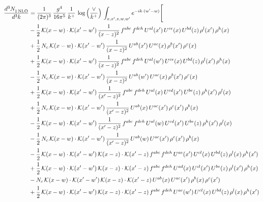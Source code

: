 \documentclass[9pt]{article}
\numberwithin{equation}{section}
\begin{document}
\begin{align}
\frac{d^{3}N_{1\,\rm NLO}^{\rm}}{d^{3}k}  & = \frac{1}{(2\pi)^{3}}\,\frac{g^{4}}{16\pi^{5}}\,\frac{1}{k^{+}}\,\log{\left(\frac{\vee}{k^{+}}\right)}\, \int_{x,x',z,w,w'}e^{-ik\cdot(w'-w)}\Bigg[\notag\\ & -\frac{1}{2}\,\mathcal{K}(x-w)\cdot\mathcal{K}(x'-w')\,\frac{1}{(x-z)^{2}}\,f^{abc}\,f^{deh}\,U^{al}(x')\,U^{ce}(x)\,U^{bd}(z)\,\rho^{l}(x')\,\rho^{h}(x)\notag\\
&+\frac{1}{2}\,N_{c}\,\mathcal{K}(x-w)\cdot\mathcal{K}(x'-w')\,\frac{1}{(x-z)^{2}}\,U^{ab}(x')\,U^{ac}(x)\,\rho^{b}(x')\,\rho^{c}(x)\notag\\
&+\frac{1}{2}\,\mathcal{K}(x-w)\cdot\mathcal{K}(x'-w')\,\frac{1}{(x-z)^{2}}\,f^{abc}\,f^{deh}\,U^{al}(w')\,U^{ce}(x)\,U^{bd}(z)\,\rho^{l}(x')\,\rho^{h}(x)\notag\\
&-\frac{1}{2}\,N_{c}\,\mathcal{K}(x-w)\cdot\mathcal{K}(x'-w')\,\frac{1}{(x-z)^{2}}\,U^{ab}(w')\,U^{ac}(x)\,\rho^{b}(x')\,\rho^{c}(x)\notag\\
&+\frac{1}{2}\,\mathcal{K}(x-w)\cdot\mathcal{K}(x'-w')\,\frac{1}{(x'-z)^{2}}\,f^{abc}\,f^{deh}\,U^{al}(x)\,U^{cd}(x')\,U^{be}(z)\,\rho^{h}(x')\,\rho^{l}(x)\notag\\
&+\frac{1}{2}\,N_{c}\,\mathcal{K}(x-w)\cdot\mathcal{K}(x'-w')\,\frac{1}{(x'-z)^{2}}\,U^{ab}(x)\,U^{ac}(x')\,\rho^{c}(x')\,\rho^{b}(x)\notag\\
&-\frac{1}{2}\,\mathcal{K}(x-w)\cdot\mathcal{K}(x'-w')\,\frac{1}{(x'-z)^{2}}\,f^{abc}\,f^{deh}\,U^{al}(w)\,U^{cd}(x')\,U^{be}(z)\,\rho^{h}(x')\,\rho^{l}(x)\notag\\
&-\frac{1}{2}\,N_{c}\,\mathcal{K}(x-w)\cdot\mathcal{K}(x'-w')\,\frac{1}{(x'-z)^{2}}\,U^{ab}(w)\,U^{ac}(x')\,\rho^{c}(x')\,\rho^{b}(x)\notag\\
&-\frac{1}{2}\,\mathcal{K}(x-w)\cdot\mathcal{K}(x'-w')\,\mathcal{K}(x-z)\cdot\mathcal{K}(x'-z)\,f^{abc}\,f^{deh}\,U^{ae}(x')\,U^{cl}(x)\,U^{bd}(z)\,\rho^{l}(x)\,\rho^{h}(x')\notag\\
&+\frac{1}{2}\,\mathcal{K}(x-w)\cdot\mathcal{K}(x'-w')\,\mathcal{K}(x-z)\cdot\mathcal{K}(x'-z)\,f^{abc}\,f^{deh}\,U^{ad}(x)\,U^{cl}(x')\,U^{be}(z)\,\rho^{l}(x')\,\rho^{h}(x)\notag\\
&-N_{c}\,\mathcal{K}(x-w)\cdot\mathcal{K}(x'-w')\,\mathcal{K}(x-z)\cdot\mathcal{K}(x'-z)\,U^{ab}(x)\,U^{ac}(x')\,\rho^{b}(x)\,\rho^{c}(x')\notag\\
&+\frac{1}{2}\,\mathcal{K}(x-w)\cdot\mathcal{K}(x'-w')\,\mathcal{K}(x-z)\cdot\mathcal{K}(x'-z)\,f^{abc}\,f^{deh}\,U^{ae}(w')\,U^{cl}(x)\,U^{bd}(z)\,\rho^{l}(x)\,\rho^{h}(x')\notag\\

\end{align}
\end{document}
